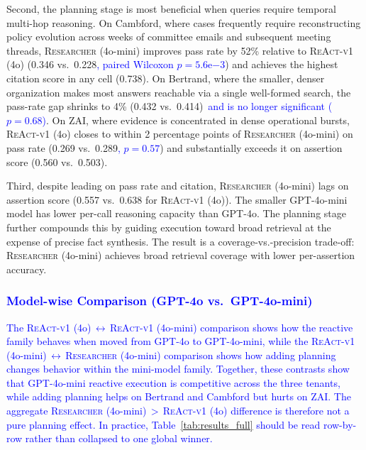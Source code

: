 Second, the planning stage is most beneficial when queries require temporal multi-hop reasoning. On Cambford, where cases frequently require reconstructing policy evolution across weeks of committee emails and subsequent meeting threads, \textsc{Researcher} (4o-mini) improves pass rate by 52\% relative to \textsc{ReAct-v1} (4o) (0.346 vs.\ 0.228\textcolor{blue}{, paired Wilcoxon $p{=}5.6\mathrm{e}{-3}$}) and achieves the highest citation score in any cell (0.738). On Bertrand, where the smaller, denser organization makes most answers reachable via a single well-formed search, the pass-rate gap shrinks to 4\% (0.432 vs.\ 0.414)\textcolor{blue}{\ and is no longer significant ($p{=}0.68$)}. On ZAI, where evidence is concentrated in dense operational bursts, \textsc{ReAct-v1} (4o) closes to within 2 percentage points of \textsc{Researcher} (4o-mini) on pass rate (0.269 vs.\ 0.289\textcolor{blue}{, $p{=}0.57$}) and substantially exceeds it on assertion score (0.560 vs.\ 0.503).

Third, despite leading on pass rate and citation, \textsc{Researcher} (4o-mini) lags on assertion score (0.557 vs.\ 0.638 for \textsc{ReAct-v1} (4o)). The smaller GPT-4o-mini model has lower per-call reasoning capacity than GPT-4o. The planning stage further compounds this by guiding execution toward broad retrieval at the expense of precise fact synthesis. The result is a coverage-vs.-precision trade-off: \textsc{Researcher} (4o-mini) achieves broad retrieval coverage with lower per-assertion accuracy.

\subsubsection{\textcolor{blue}{Model-wise Comparison (GPT-4o vs.\ GPT-4o-mini)}}
\label{sec:ablation-model}
\textcolor{blue}{The \textsc{ReAct-v1} (4o)\,$\leftrightarrow$\,\textsc{ReAct-v1} (4o-mini) comparison shows how the reactive family behaves when moved from GPT-4o to GPT-4o-mini, while the \textsc{ReAct-v1} (4o-mini)\,$\leftrightarrow$\,\textsc{Researcher} (4o-mini) comparison shows how adding planning changes behavior within the mini-model family. Together, these contrasts show that GPT-4o-mini reactive execution is competitive across the three tenants, while adding planning helps on Bertrand and Cambford but hurts on ZAI. The aggregate \textsc{Researcher} (4o-mini)\,$>$\,\textsc{ReAct-v1} (4o) difference is therefore not a pure planning effect. In practice, Table~\ref{tab:results_full} should be read row-by-row rather than collapsed to one global winner.}

